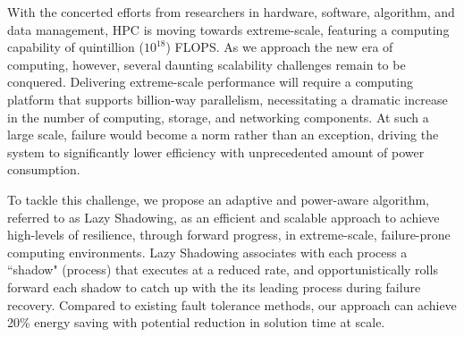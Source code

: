 With the concerted efforts from researchers in hardware, software, algorithm, and data management, HPC is moving towards extreme-scale, featuring a computing capability of quintillion ($10^{18}$) FLOPS. 
As we approach the new era of computing, however, several daunting scalability challenges remain to be conquered. Delivering extreme-scale performance will require a computing platform that supports billion-way parallelism, necessitating a dramatic increase in the number of computing, storage, and networking components. At such a large scale, failure would become a norm rather than an exception, driving the system to significantly lower efficiency with unprecedented amount of power consumption. %

To tackle this challenge, we propose an adaptive and power-aware algorithm, referred to as Lazy Shadowing, as an efficient and scalable approach to achieve high-levels of resilience, through forward progress, in extreme-scale, failure-prone computing environments. 
Lazy Shadowing associates with each process a ``shadow" (process) that executes at a reduced rate, and opportunistically rolls forward each shadow to catch up with the its leading process during failure recovery.
Compared to existing fault tolerance methods, our approach can achieve 20\% energy saving with potential reduction in solution time at scale.
